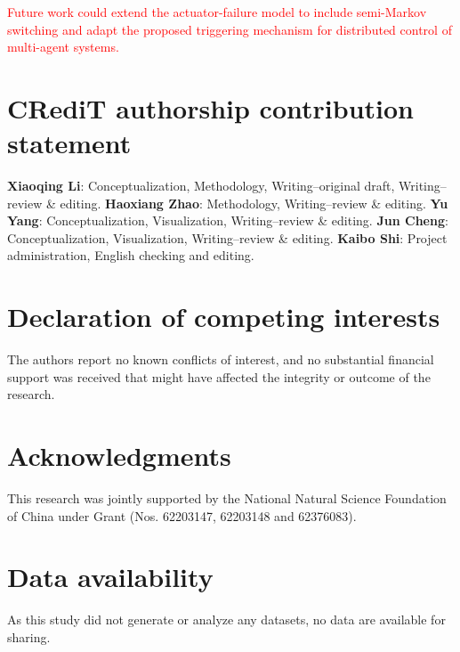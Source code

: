 \documentclass[preprint,review,fleqn,sort&compress,3p]{elsarticle}
\theoremstyle{definition} %
\theoremstyle{definition}%
\begin{document}
	\textcolor{red}{Future work could extend the actuator-failure model to include semi-Markov switching and adapt the proposed triggering mechanism for distributed control of multi-agent systems.}
	
	
	\section*{CRediT authorship contribution statement}
	{\bf Xiaoqing Li}: Conceptualization, Methodology, Writing--original draft, Writing--review \& editing. %
	{\bf Haoxiang Zhao}: Methodology, Writing--review \& editing. 
	{\bf Yu Yang}: Conceptualization, Visualization, Writing--review \& editing.
	{\bf Jun Cheng}: Conceptualization, Visualization, Writing--review \& editing. 
	{\bf Kaibo Shi}: Project administration, English checking and editing. 
	\section*{Declaration of competing interests}
	The authors report no known conflicts of interest, and no substantial financial support was received that might have affected the integrity or outcome of the research.
	
	\section*{Acknowledgments}
	This research was jointly supported by the National Natural Science Foundation of China under Grant (Nos. 62203147, 62203148 and 62376083).
	\section*{Data availability}
	As this study did not generate or analyze any datasets, no data are available for sharing.
	
	\renewcommand{\refname}{References}
	 
	 
\end{document}
